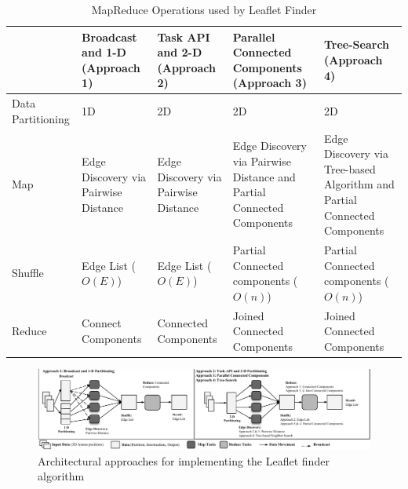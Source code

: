 \begin{table}[t]
    \scriptsize
    \centering
    \begin{tabular}{@{}p{2cm}|p{2.8cm}p{2.8cm}p{2.8cm}p{2.8cm}@{}}
        \toprule
        &
        \textbf{Broadcast and 1-D} (Approach 1) &
        \textbf{Task API and 2-D} (Approach 2) &
        \textbf{Parallel Connected Components} (Approach 3) &
        \textbf{Tree-Search} (Approach 4)\\
        \midrule
        Data Partitioning  &
        1D  &
        2D &
        2D &
        2D\\
        Map &
        Edge Discovery via Pairwise Distance &
        Edge Discovery via Pairwise Distance &
        Edge Discovery via Pairwise Distance and Partial Connected Components &
        Edge Discovery via Tree-based Algorithm and Partial Connected Components\\
        Shuffle &
        Edge List ($O(E)$) &
        Edge List ($O(E)$) &
        Partial Connected components ($O(n)$) &
        Partial Connected components ($O(n)$)\\
        Reduce   &
        Connect Components  &
        Connected Components &
        Joined Connected Components &
        Joined Connected Components\\
        \bottomrule
    \end{tabular}
    \caption{MapReduce Operations used by Leaflet Finder\label{tab:app_operators}}
\end{table}

\begin{figure}[t]
    \centering
    \includegraphics[width=.95\textwidth]{figures/data_analytics_hpc/task_par/lf_approaches.pdf}
    \caption{Architectural approaches for implementing the Leaflet finder algorithm\label{fig:lf_approaches}}
\end{figure}

